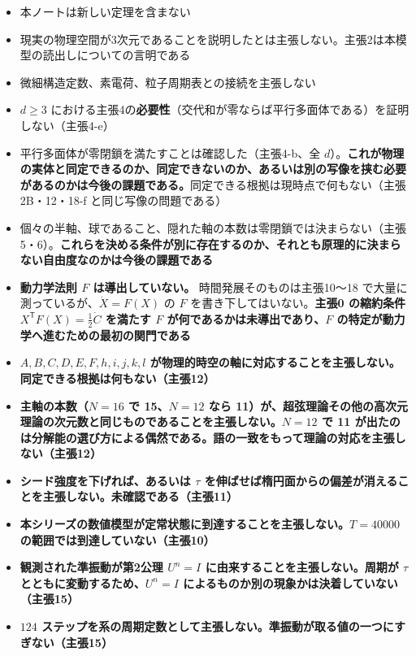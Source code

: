 \documentclass[
  10pt,
]{ltjsarticle}
\providecommand{\tightlist}{%
  \setlength{\itemsep}{0pt}\setlength{\parskip}{0pt}}
\begin{document}
\begin{itemize}
\tightlist
\item
  本ノートは新しい定理を含まない
\item
  現実の物理空間が3次元であることを説明したとは主張しない。主張2は本模型の読出しについての言明である
\item
  微細構造定数、素電荷、粒子周期表との接続を主張しない
\item
  \(d\ge3\)
  における主張4の\textbf{必要性}（交代和が零ならば平行多面体である）を証明しない（主張4-e）
\item
  平行多面体が零閉鎖を満たすことは確認した（主張4-b、全
  \(d\)）。\textbf{これが物理の実体と同定できるのか、同定できないのか、あるいは別の写像を挟む必要があるのかは今後の課題である。}同定できる根拠は現時点で何もない（主張2B・12・18-f
  と同じ写像の問題である）
\item
  個々の半軸、球であること、隠れた軸の本数は零閉鎖では決まらない（主張5・6）。\textbf{これらを決める条件が別に存在するのか、それとも原理的に決まらない自由度なのかは今後の課題である}
\item
  \textbf{動力学法則 \(F\) は導出していない。}
  時間発展そのものは主張10〜18 で大量に測っているが、\(\dot X = F(X)\)
  の \(F\) を書き下してはいない。\textbf{主張0 の縮約条件
  \(X^{\mathsf T}F(X)=\tfrac12\dot C\) を満たす \(F\)
  が何であるかは未導出であり、\(F\)
  の特定が動力学へ進むための最初の関門である}
\item
  \textbf{\(A,B,C,D,E,F,h,i,j,k,l\)
  が物理的時空の軸に対応することを主張しない。同定できる根拠は何もない（主張12）}
\item
  \textbf{主軸の本数（\(N=16\) で 15、\(N=12\) なら
  11）が、超弦理論その他の高次元理論の次元数と同じものであることを主張しない。\(N=12\)
  で 11
  が出たのは分解能の選び方による偶然である。語の一致をもって理論の対応を主張しない（主張12）}
\item
  \textbf{シード強度を下げれば、あるいは \(\tau\)
  を伸ばせば楕円面からの偏差が消えることを主張しない。未確認である（主張11）}
\item
  \textbf{本シリーズの数値模型が定常状態に到達することを主張しない。\(T = 40000\)
  の範囲では到達していない（主張10）}
\item
  \textbf{観測された準振動が第2公理 \(U^n = I\)
  に由来することを主張しない。周期が \(\tau\)
  とともに変動するため、\(U^n = I\)
  によるものか別の現象かは決着していない（主張15）}
\item
  \textbf{\(124\)
  ステップを系の周期定数として主張しない。準振動が取る値の一つにすぎない（主張15）}

\end{itemize}
\end{document}
